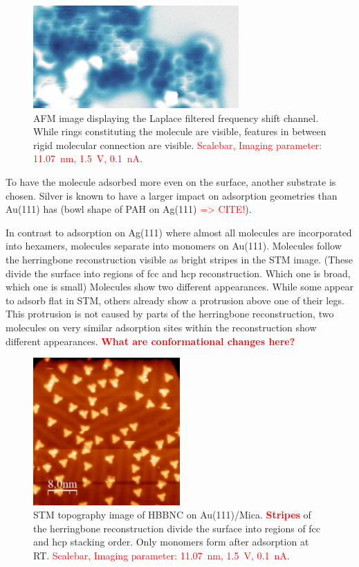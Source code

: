 \begin{figure}[] \centering
	\includegraphics[width=0.7\textwidth]{./images/hbbnc-annealed-afm}
	\caption{AFM image displaying the Laplace filtered frequency shift channel. While rings constituting the molecule are visible, features in between rigid molecular connection are visible. \textcolor{red}{Scalebar, Imaging parameter: \SI{11.07}{\nano \meter}, \SI{1.5}{\volt}, \SI{0.1}{\nano \ampere}}.}
	\label{}
\end{figure}

To have the molecule adsorbed more even on the surface, another substrate is chosen. Silver is known to have a larger impact on adsorption geometries than Au(111) has (bowl shape of PAH on Ag(111) \textcolor{red}{=> CITE!}).

In contrast to adsorption on Ag(111) where almost all molecules are incorporated into hexamers, molecules separate into monomers on Au(111). Molecules follow the herringbone reconstruction visible as bright stripes in the STM image. 
(These divide the surface into regions of fcc and hcp reconstruction.
Which one is broad, which one is small)
Molecules show two different appearances. While some appear to adsorb flat in STM, others already show a protrusion above one of their legs. This protrusion is not caused by parts of the herringbone reconstruction, two molecules on very similar adsorption sites within the reconstruction show different appearances.
\textcolor{red}{\textbf{What are conformational changes here?}}

\begin{figure}[] \centering
	\includegraphics[width=0.5\textwidth]{./images/hbbnc-au-111-rt}
	\caption{STM topography image of HBBNC on Au(111)/Mica. \textcolor{red}{\textbf{Stripes}} of the herringbone reconstruction divide the surface into regions of fcc and hcp stacking order. Only monomers form after adsorption at RT. \textcolor{red}{Scalebar, Imaging parameter: \SI{11.07}{\nano \meter}, \SI{1.5}{\volt}, \SI{0.1}{\nano \ampere}}.}
	\label{}
\end{figure}

